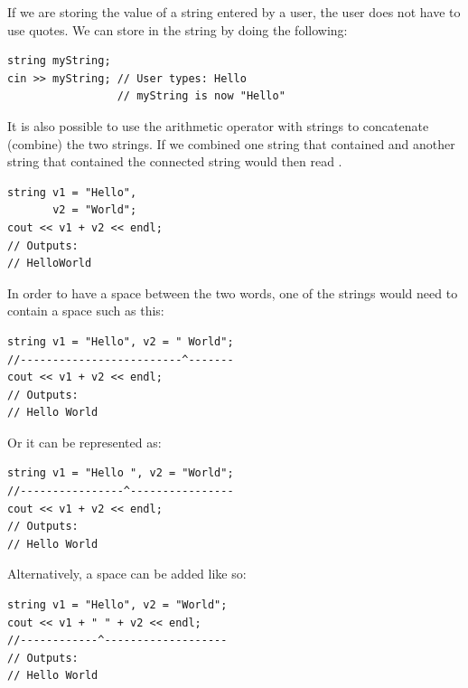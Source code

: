 If we are storing the value of a string entered by a user, the user does not have to use quotes.
We can store  in the string by doing the following:

\noindent\begin{minipage}{\linewidth}\begin{lstlisting}
string myString;
cin >> myString; // User types: Hello
                 // myString is now "Hello"
\end{lstlisting}\end{minipage}

\noindent It is also possible to use the arithmetic operator \Code{+} with strings to concatenate (combine) the two strings.
If we combined one string that contained  and another string that contained  the connected string would then read .

\noindent\begin{minipage}{\linewidth}\begin{lstlisting}
string v1 = "Hello",
       v2 = "World";
cout << v1 + v2 << endl;
// Outputs:
// HelloWorld
\end{lstlisting}\end{minipage}



In order to have a space between the two words, one of the strings would need to contain a space such as this:

\noindent\begin{minipage}{\linewidth}\begin{lstlisting}
string v1 = "Hello", v2 = " World";
//-------------------------^-------
cout << v1 + v2 << endl;
// Outputs:
// Hello World
\end{lstlisting}\end{minipage}

\noindent Or it can be represented as: 

\noindent\begin{minipage}{\linewidth}\begin{lstlisting}
string v1 = "Hello ", v2 = "World";
//----------------^----------------
cout << v1 + v2 << endl;
// Outputs:
// Hello World
\end{lstlisting}\end{minipage}

\noindent Alternatively, a space can be added like so: \nopagebreak[4]

\noindent\begin{minipage}{\linewidth}\begin{lstlisting}
string v1 = "Hello", v2 = "World";
cout << v1 + " " + v2 << endl;
//------------^-------------------
// Outputs:
// Hello World
\end{lstlisting}\end{minipage}

